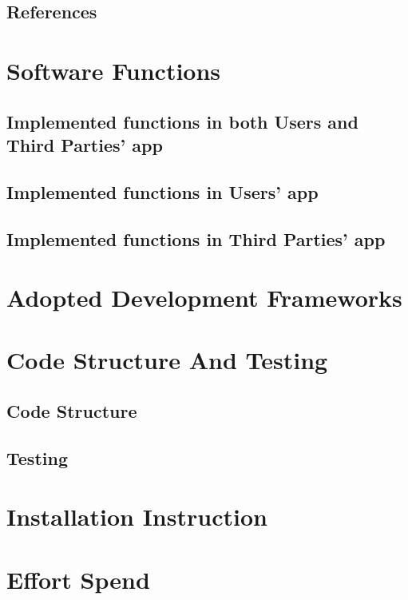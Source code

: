 \documentclass[a4paper,12pt]{report}
\begin{document}
	\section{References}
	

	\chapter{Software Functions}
	\label{ch: Software_Functions}

	\section{Implemented functions in both Users and Third Parties' app }
	

	\section{Implemented functions in Users' app}
	

	\section{Implemented functions in Third Parties' app}
	


	\chapter{Adopted Development Frameworks}
	\label{ch: Adopted_Development_Frameworks}
	


	\chapter{Code Structure And Testing} 
	\label{ch:Code_Structure}

	\section{Code Structure}
	

	\section{Testing}
	

	\chapter{Installation Instruction} 
	\label{ch: Installation_Instruction}
	

	\appendix
	\chapter{Effort Spend}
	
\end{document}
